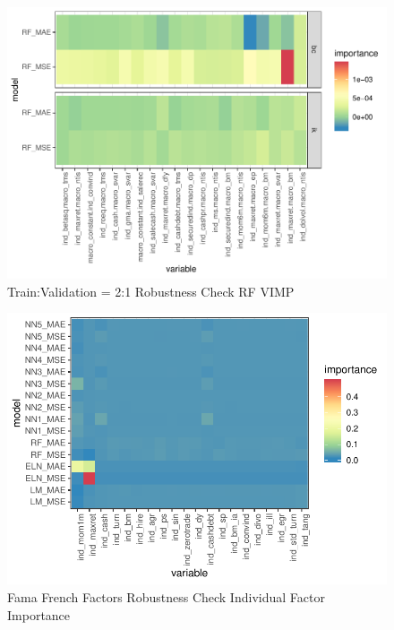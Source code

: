 \documentclass{article}
\begin{document}

\begin{figure}
	\includegraphics[]{../../Results/empirical_train_valid_2/empirical_vimp.pdf}
	\caption{Train:Validation = 2:1 Robustness Check RF VIMP}
\end{figure}





\FloatBarrier


\begin{figure}
	\includegraphics[]{../../Results/empirical_ff/empirical_all_sample_vi_ind.pdf}
	\caption{Fama French Factors Robustness Check Individual Factor Importance}
\end{figure}
\end{document}
